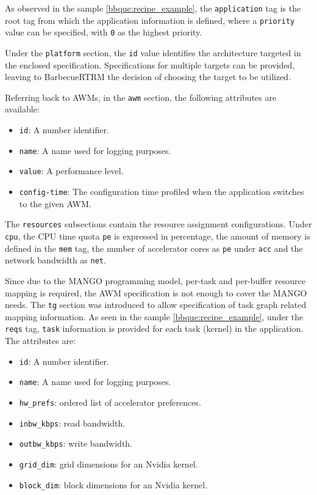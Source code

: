 As observed in the sample \ref{bbque:recipe_example}, the \texttt{application} tag is the root tag from which the application information is defined, where a \texttt{priority} value can be specified, with \texttt{0} as the highest priority.

Under the \texttt{platform} section, the \texttt{id} value identifies the architecture targeted in the enclosed specification. Specifications for multiple targets can be provided, leaving to BarbecueRTRM the decision of choosing the target to be utilized.

Referring back to AWMs, in the \texttt{awm} section, the following attributes are available:

\begin{itemize}
    \item \texttt{id}: A number identifier.
    \item \texttt{name}: A name used for logging purposes.
    \item \texttt{value}: A performance level.
    \item \texttt{config-time}: The configuration time profiled when the application switches to the given AWM.
\end{itemize}

The \texttt{resources} subsections contain the resource assignment configurations. Under \texttt{cpu}, the CPU time quota \texttt{pe} is expressed in percentage, the amount of memory is defined in the \texttt{mem} tag, the number of accelerator cores as \texttt{pe} under \texttt{acc} and the network bandwidth as \texttt{net}.

Since due to the MANGO programming model, per-task and per-buffer resource mapping is required, the AWM specification is not enough to cover the MANGO needs. The \texttt{tg} section was introduced to allow specification of task graph related mapping information.
As seen in the sample \ref{bbque:recipe_example}, under the \texttt{reqs} tag, \texttt{task} information is provided for each task (kernel) in the application. The attributes are:

\begin{itemize}
    \item \texttt{id}: A number identifier.
    \item \texttt{name}: A name used for logging purposes.
    \item \texttt{hw\_prefs}: ordered list of accelerator preferences.
    \item \texttt{inbw\_kbps}: read bandwidth.
    \item \texttt{outbw\_kbps}: write bandwidth.
    \item \texttt{grid\_dim}: grid dimensions for an Nvidia kernel.
    \item \texttt{block\_dim}: block dimensions for an Nvidia kernel.
\end{itemize}

